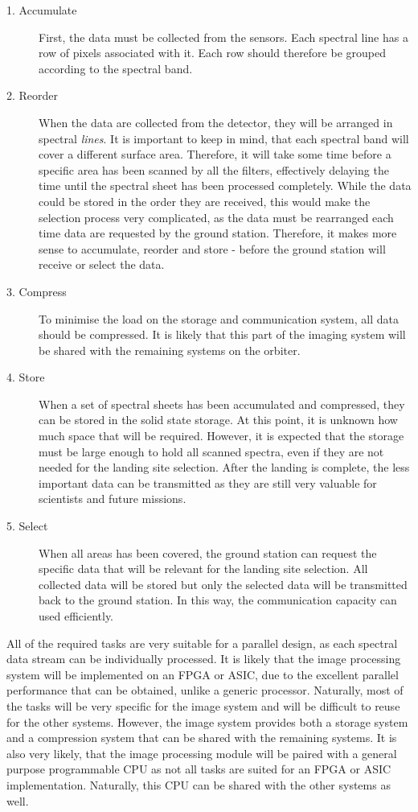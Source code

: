 \begin{description}
\item[1. Accumulate] First, the data must be collected from the sensors. Each spectral line has a row of pixels associated with it. Each row should therefore be grouped according to the spectral band.
\item[2. Reorder] When the data are collected from the detector, they will be arranged in spectral \textit{lines}. It is important to keep in mind, that each spectral band will cover a different surface area. Therefore, it will take some time before a specific area has been scanned by all the filters, effectively delaying the time until the spectral sheet has been processed completely. While the data could be stored in the order they are received, this would make the selection process very complicated, as the data must be rearranged each time data are requested by the ground station. Therefore, it makes more sense to accumulate, reorder and store - before the ground station will receive or select the data.
\item[3. Compress] To minimise the load on the storage and communication system, all data should be compressed. It is likely that this part of the imaging system will be shared with the remaining systems on the orbiter.
\item[4. Store] When a set of spectral sheets has been accumulated and compressed, they can be stored in the solid state storage. At this point, it is unknown how much space that will be required. However, it is expected that the storage must be large enough to hold all scanned spectra, even if they are not needed for the landing site selection. After the landing is complete, the less important data can be transmitted as they are still very valuable for scientists and future missions.
\item[5. Select] When all areas has been covered, the ground station can request the specific data that will be relevant for the landing site selection. All collected data will be stored but only the selected data will be transmitted back to the ground station. In this way, the communication capacity can used efficiently. 
\end{description}
All of the required tasks are very suitable for a parallel design, as each spectral data stream can be individually processed. It is likely that the image processing system will be implemented on an FPGA or ASIC, due to the excellent parallel performance that can be obtained, unlike a generic processor. 
Naturally, most of the tasks will be very specific for the image system and will be difficult to reuse for the other systems. However, the image system provides both a storage system and a compression system that can be shared with the remaining systems. It is also very likely, that the image processing module will be paired with a general purpose programmable CPU as not all tasks are suited for an FPGA or ASIC implementation. Naturally, this CPU can be shared with the other systems as well.
